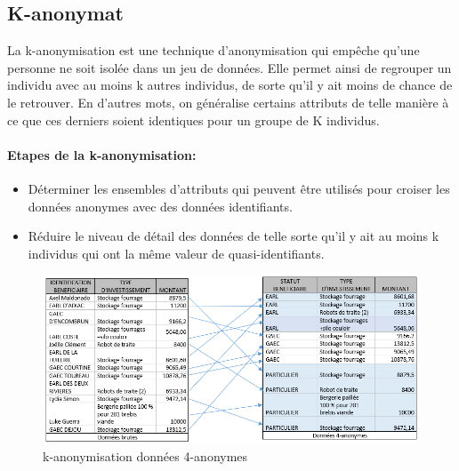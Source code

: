 \subsection{K-anonymat} 

La k-anonymisation est une technique d’anonymisation qui empêche qu’une personne ne soit isolée dans un jeu de données. Elle permet ainsi de regrouper un individu avec au moins k autres individus, de sorte qu’il y ait moins de chance de le retrouver. En d’autres mots, on généralise certains attributs de telle manière à ce que ces derniers soient identiques pour un groupe de K individus\cite{noauthor_institut_1992}. 

\paragraph{Etapes de la k-anonymisation:} 
\begin{itemize}
    \item  Déterminer les ensembles d’attributs qui peuvent être utilisés pour croiser les données anonymes avec des données identifiants. 

    \item Réduire le niveau de détail des données de telle sorte qu’il y ait au moins k individus qui ont la même valeur de quasi-identifiants. 
\end{itemize}

\begin{figure}
    \centering
     
    \includegraphics[width=1\textwidth]{images/anonymisation/k_anonym_image1.png}
    \caption{k-anonymisation données 4-anonymes}
    \label{k-anonymisation données 4-anonymes}
\end{figure}


